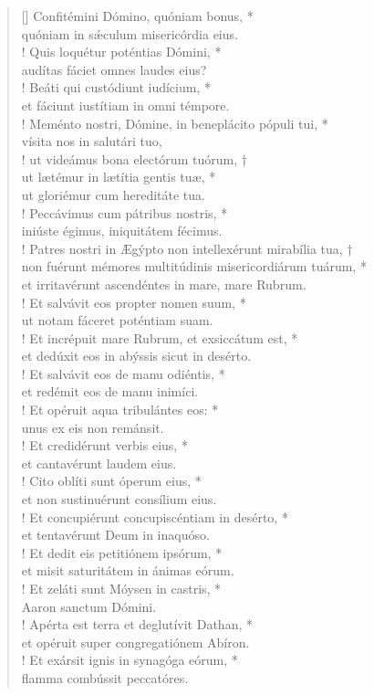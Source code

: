 \begin{verse}[\versewidth]
Confitémini Dómino, quóniam bonus, *\\
quóniam in s\'{æ}culum misericórdia eius.\\!
\vin Quis loquétur poténtias Dómini, *\\
\vin audítas fáciet omnes laudes eius?\\!
Beáti qui custódiunt iudícium, *\\
et fáciunt iustítiam in omni témpore.\\!
\vin Meménto nostri, Dómine, in beneplácito pópuli tui, *\\
\vin vísita nos in salutári tuo,\\!
ut videámus bona electórum tuórum, †\\
ut lætémur in lætítia gentis tuæ, *\\
ut gloriémur cum hereditáte tua.\\!
\vin Peccávimus cum pátribus nostris, *\\
\vin iniúste égimus, iniquitátem fécimus.\\!
Patres nostri in Ægýpto non intellexérunt mirabília tua, †\\
non fuérunt mémores multitúdinis misericordiárum tuárum, *\\
et irritavérunt ascendéntes in mare, mare Rubrum.\\!
\vin Et salvávit eos propter nomen suum, *\\
\vin ut notam fáceret poténtiam suam.\\!
Et incrépuit mare Rubrum, et exsiccátum est, *\\
et dedúxit eos in abýssis sicut in desérto.\\!
\vin Et salvávit eos de manu odiéntis, *\\
\vin et redémit eos de manu inimíci.\\!
Et opéruit aqua tribulántes eos: *\\
unus ex eis non remánsit.\\!
\vin Et credidérunt verbis eius, *\\
\vin et cantavérunt laudem eius.\\!
Cito oblíti sunt óperum eius, *\\
et non sustinuérunt consílium eius.\\!
\vin Et concupiérunt concupiscéntiam in desérto, *\\
\vin et tentavérunt Deum in inaquóso.\\!
Et dedit eis petitiónem ipsórum, *\\
et misit saturitátem in ánimas eórum.\\!
\vin Et zeláti sunt Móysen in castris, *\\
\vin Aaron sanctum Dómini.\\!
Apérta est terra et deglutívit Dathan, *\\
et opéruit super congregatiónem Abíron.\\!
\vin Et exársit ignis in synagóga eórum, *\\
\vin flamma combússit peccatóres.\\
\end{verse}
